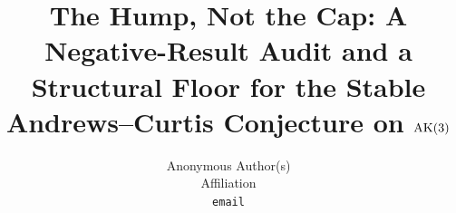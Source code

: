 \documentclass{article}
\title{The Hump, Not the Cap: A Negative-Result Audit and a Structural
  Floor for the Stable Andrews--Curtis Conjecture on $\mathrm{AK}(3)$}
\author{%
  Anonymous Author(s)\\
  Affiliation\\
  \texttt{email}\\
}
\begin{document}
\maketitle

\begin{abstract}

\end{abstract}











\newpage
\appendix








\end{document}
